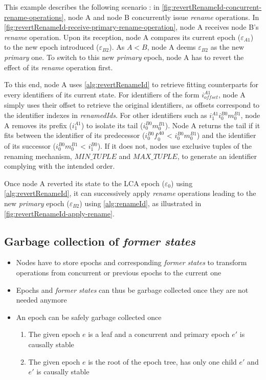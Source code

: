 \documentclass[sigplan,10pt]{acmart}
\newcommand{\trm}[1]{\mathit{#1}}
\newcommand{\id}[3]{$\trm{#1}^{\trm{#2}}_{\trm{#3}}$}
\newcommand{\epoch}[1]{$\varepsilon_{#1}$}
\begin{document}
This example describes the following scenario : in \autoref{fig:revertRenameId-concurrent-rename-operations}, node A and node B concurrently issue \emph{rename} operations.
In \autoref{fig:revertRenameId-receive-primary-rename-operation}, node A receives node B's \emph{rename} operation.
Upon its reception, node A compares its current epoch (\epoch{A1}) to the new epoch introduced (\epoch{B2}).
As $A < B$, node A deems \epoch{B2} as the new \emph{primary} one.
To switch to this new \emph{primary} epoch, node A has to revert the effect of its \emph{rename} operation first.

To this end, node A uses \autoref{alg:revertRenameId} to retrieve fitting counterparts for every identifiers of its current state.
For identifiers of the form \id{i}{A1}{offset}, node A simply uses their offset to retrieve the original identifiers, as offsets correspond to the identifier indexes in \emph{renamedIds}.
For other identifiers such as \id{i}{A1}{1}\id{i}{B0}{0}\id{m}{B1}{0}, node A removes its prefix (\id{i}{A1}{1}) to isolate its tail (\id{i}{B0}{0}\id{m}{B1}{0}).
Node A returns the tail if it fits between the identifier of its predecessor (\id{i}{B0}{0}\id{f}{A0}{0} < \id{i}{B0}{0}\id{m}{B1}{0}) and the identifier of its successor (\id{i}{B0}{0}\id{m}{B1}{0} < \id{i}{B0}{1}).
If it does not, nodes use exclusive tuples of the renaming mechanism, $\trm{MIN\_TUPLE}$ and $\trm{MAX\_TUPLE}$, to generate an identifier complying with the intended order.

Once node A reverted its state to the LCA epoch (\epoch{0}) using \autoref{alg:revertRenameId}, it can successively apply \emph{rename} operations leading to the new \emph{primary} epoch (\epoch{B2}) using \autoref{alg:renameId}, as illustrated in \autoref{fig:revertRenameId-apply-rename}.

\subsection{Garbage collection of \emph{former states}}

\begin{itemize}
    \item Nodes have to store epochs and corresponding \emph{former states} to transform operations from concurrent or previous epochs to the current one
    \item Epochs and \emph{former states} can thus be garbage collected once they are not needed anymore
    \item An epoch can be safely garbage collected once
    \begin{enumerate}
        \item The given epoch $e$ is a leaf and a concurrent and primary epoch $e'$ is causally stable
        \item The given epoch $e$ is the root of the epoch tree, has only one child $e'$ and $e'$ is causally stable
    \end{enumerate}
\end{itemize}
\end{document}

